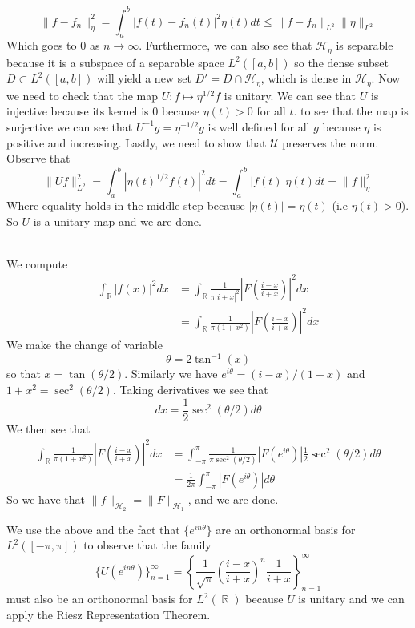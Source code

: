 \documentclass{article}
\DeclareMathOperator{\R}{\mathbb{R}}
\newcommand{\problem}[1]{\noindent{\textbf{Problem #1}}\\}
\newcommand{\problempart}[1]{\noindent{\textbf{(#1)}}}
\newcommand{\norm}[1]{\|#1\|}
\begin{document}
\[
\norm{f - f_n}^2_\eta = \int_a^b |f(t) - f_n(t)|^2\eta(t)dt \leq \norm{f-f_n}_{L^2}\norm{\eta}_{L^2}
\]
Which goes to $0$ as $n \to \infty$. Furthermore, we can also see that $\mathcal{H}_\eta$ is separable because it is a subspace of a separable space $L^2([a,b])$ so the dense subset $D \subset L^{2}([a,b])$ will yield a new set $D' = D \cap \mathcal{H}_\eta$, which is dense in $\mathcal{H}_\eta$. Now we need to check that the map $U: f \mapsto \eta^{1/2}f$ is unitary. We can see that $U$ is injective because its kernel is $0$ because $\eta(t) > 0$ for all $t$. to see that the map is surjective we can see that $U^{-1}g = \eta^{-1/2}g$ is well defined for all $g$ because $\eta$ is positive and increasing. Lastly, we need to show that $\mathcal{U}$ preserves the norm. Observe that
\[
\norm{Uf}_{L^2}^2 = \int_a^b |\eta(t)^{1/2}f(t)|^{2}dt = \int_a^b |f(t)|\eta(t)dt = \norm{f}_\eta^2
\]
Where equality holds in the middle step because $|\eta(t)| = \eta(t)$ (i.e $\eta(t) > 0$). So $U$ is a unitary map and we are done. 
 
\problem{4.7.9}
\problempart{a} We compute
\begin{align*}
\int_{\R} |f(x)|^2dx &= \int_{\R} \frac{1}{\pi |i+x|^2}\left| F\left(\frac{i-x}{i+x}\right)\right|^2dx \\
&= \int_{\R} \frac{1}{\pi (1 + x^2)}\left| F\left(\frac{i-x}{i+x}\right)\right|^2dx
\end{align*}
We make the change of variable 
\[
\theta = 2\tan^{-1}(x)
\]
so that $x = \tan(\theta/2)$. Similarly we have $e^{i\theta}= (i-x)/(1+x)$ and $1+x^2 = \sec^2(\theta/2)$. Taking derivatives we see that 
\[
dx = \frac{1}{2}\sec^2(\theta/2)d\theta
\] We then see that
\begin{align*}
\int_{\R} \frac{1}{\pi (1 + x^2)}\left| F\left(\frac{i-x}{i+x}\right)\right|^2dx &= \int_{-\pi}^\pi \frac{1}{\pi\sec^2(\theta/2)}|F(e^{i\theta})|\frac{1}{2}\sec^2(\theta/2)d\theta \\
&= \frac{1}{2\pi}\int_{-\pi}^\pi |F(e^{i\theta})|d\theta
\end{align*}
So we have that $\norm{f}_{\mathcal{H}_2} = \norm{F}_{\mathcal{H}_1}$, and we are done. 

\problempart{b} We use the above and the fact that $\{e^{in\theta}\}$ are an orthonormal basis for $L^2([-\pi, \pi])$ to observe that the family
\[
\{U(e^{in\theta})\}_{n=1}^{\infty} = \left\{ \frac{1}{\sqrt{\pi}}\left(\frac{i-x}{i+x}\right)^n\frac{1}{i+x}\right\}_{n=1}^\infty
\]
must also be an orthonormal basis for $L^2(\R)$ because $U$ is unitary and we can apply the Riesz Representation Theorem.
\end{document}
